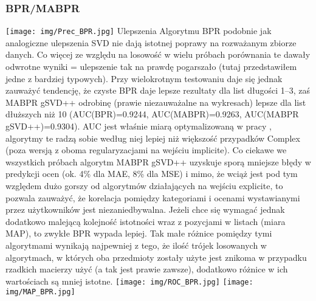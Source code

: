 \documentclass{pracamgr}
\begin{document}
    \subsubsection{BPR/MABPR}
     \texttt{[image: img/Prec\_BPR.jpg]}\newline
     Ulepszenia Algorytmu BPR podobnie jak analogiczne ulepszenia SVD nie dają istotnej poprawy na rozważanym zbiorze danych.
     Co więcej ze względu na losowość w wielu próbach porównania te dawały odwrotne wyniki = ulepszenie tak na prawdę pogarszało (tutaj przedstawiłem jedne z bardziej typowych).
     Przy wielokrotnym testowaniu daje się jednak zauważyć tendencję, że czyste BPR daje lepsze rezultaty dla list długości 1--3,
     zaś MABPR gSVD++ odrobinę (prawie niezauważalne na wykresach) lepsze dla list dłuższych niż 10 (AUC(BPR)=0.9244, AUC(MABPR)=0.9263, AUC(MABPR gSVD++)=0.9304).
     AUC jest właśnie miarą optymalizowaną w pracy \cite{191}, algorytmy te radzą sobie według niej lepiej niż większość przypadków Complex
     (poza wersją z oboma regularyzacjami na wejściu implicite).
     Co ciekawe we wszystkich próbach algorytm MABPR gSVD++ uzyskuje sporą mniejsze błędy w predykcji ocen (ok. 4\% dla MAE, 8\% dla MSE) i mimo,
     że wciąż jest pod tym względem dużo gorszy od algorytmów działających na wejściu explicite, to pozwala zauważyć,
     że korelacja pomiędzy kategoriami i ocenami wystawianymi przez użytkowników jest niezaniedbywalna.
     Jeżeli chce się wymagać jednak dodatkowo malejącą kolejność istotności wraz z pozycjami w listach (miara MAP), to zwykłe BPR wypada lepiej.
     Tak małe różnice pomiędzy tymi algorytmami wynikają najpewniej z tego, że ilość trójek losowanych w algorytmach, w których oba przedmioty
     zostały użyte jest znikoma w przypadku rzadkich macierzy użyć (a tak jest prawie zawsze), dodatkowo różnice w ich wartościach są mniej istotne.\newline
     \texttt{[image: img/ROC\_BPR.jpg]}
     \texttt{[image: img/MAP\_BPR.jpg]}    
\end{document}
